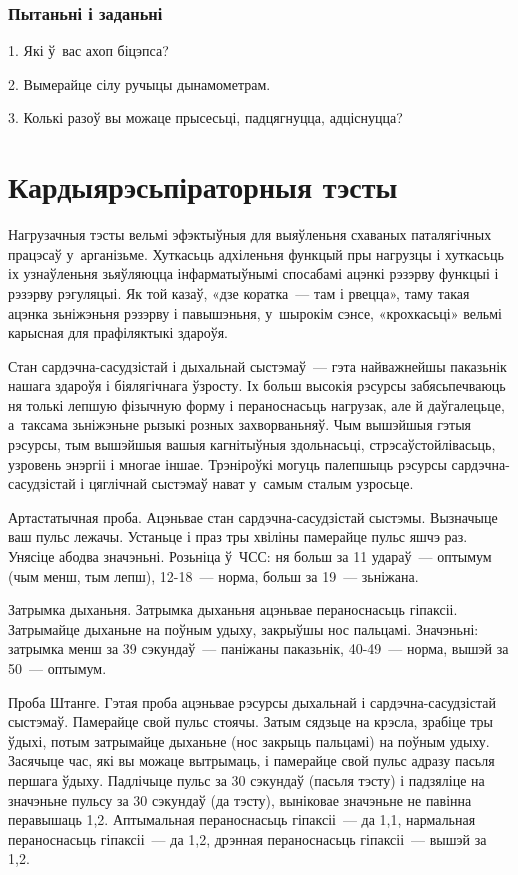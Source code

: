 \subsubsection{Пытаньні і заданьні}

1. Які ў~вас ахоп біцэпса?

2. Вымерайце сілу ручыцы дынамометрам.

3. Колькі разоў вы можаце прысесьці, падцягнуцца, адціснуцца?


\section{Кардыярэсьпіраторныя тэсты}

Нагрузачныя тэсты вельмі эфэктыўныя для выяўленьня схаваных паталягічных працэсаў у~арганізьме. Хуткасьць адхіленьня функцый пры нагрузцы і хуткасьць іх узнаўленьня зьяўляюцца інфарматыўнымі спосабамі ацэнкі рэзэрву функцыі і рэзэрву рэгуляцыі. Як той казаў, «дзе коратка~--- там і рвецца», таму такая ацэнка зьніжэньня рэзэрву і павышэньня, у~шырокім сэнсе, «крохкасьці» вельмі карысная для прафіляктыкі здароўя.

Стан сардэчна-сасудзістай і дыхальнай сыстэмаў~--- гэта найважнейшы паказьнік нашага здароўя і біялягічнага ўзросту. Іх больш высокія рэсурсы забясьпечваюць ня толькі лепшую фізычную форму і пераноснасьць нагрузак, але й даўгалецьце, а~таксама зьніжэньне рызыкі розных захворваньняў. Чым вышэйшыя гэтыя рэсурсы, тым вышэйшыя вашыя кагнітыўныя здольнасьці, стрэсаўстойлівасьць, узровень энэргіі і многае іншае. Трэніроўкі могуць палепшыць рэсурсы сардэчна-сасудзістай і цяглічнай сыстэмаў нават у~самым сталым узросьце.

Артастатычная проба. Ацэньвае стан сардэчна-сасудзістай сыстэмы. Вызначыце ваш пульс лежачы. Устаньце і праз тры хвіліны памерайце пульс яшчэ раз. Унясіце абодва значэньні. Розьніца ў~ЧСС: ня больш за 11 удараў~--- оптымум (чым менш, тым лепш), 12-18~--- норма, больш за 19~--- зьніжана.

Затрымка дыханьня. Затрымка дыханьня ацэньвае пераноснасьць гіпаксіі. Затрымайце дыханьне на поўным удыху, закрыўшы нос пальцамі. Значэньні: затрымка менш за 39 сэкундаў~--- паніжаны паказьнік, 40-49~--- норма, вышэй за 50~--- оптымум.

Проба Штанге. Гэтая проба ацэньвае рэсурсы дыхальнай і сардэчна-сасудзістай сыстэмаў. Памерайце свой пульс стоячы. Затым сядзьце на крэсла, зрабіце тры ўдыхі, потым затрымайце дыханьне (нос закрыць пальцамі) на поўным удыху. Засячыце час, які вы можаце вытрымаць, і памерайце свой пульс адразу пасьля першага ўдыху. Падлічыце пульс за 30 сэкундаў (пасьля тэсту) і падзяліце на значэньне пульсу за 30 сэкундаў (да тэсту), выніковае значэньне не павінна перавышаць 1,2. Аптымальная пераноснасьць гіпаксіі~--- да 1,1, нармальная пераноснасьць гіпаксіі~--- да 1,2, дрэнная пераноснасьць гіпаксіі~--- вышэй за 1,2.

